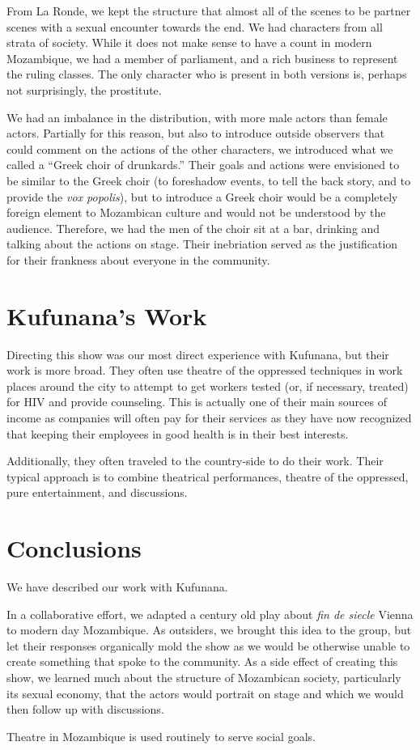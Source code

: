 \documentclass[article,twocolumn,twoside]{memoir}
\begin{document}
From La Ronde, we kept the structure that almost all of the scenes to be
partner scenes with a sexual encounter towards the end. We had characters from
all strata of society.  While it does not make sense to have a count in modern
Mozambique, we had a member of parliament, and a rich business to represent the
ruling classes. The only character who is present in both versions is, perhaps
not surprisingly, the prostitute.

We had an imbalance in the distribution, with more male actors than female
actors. Partially for this reason, but also to introduce outside observers that
could comment on the actions of the other characters, we introduced what we
called a ``Greek choir of drunkards.'' Their goals and actions were envisioned
to be similar to the Greek choir (to foreshadow events, to tell the back story,
and to provide the \textit{vox popolis}), but to introduce a Greek choir would
be a completely foreign element to Mozambican culture and would not be
understood by the audience. Therefore, we had the men of the choir sit at a
bar, drinking and talking about the actions on stage. Their inebriation served
as the justification for their frankness about everyone in the community.

\chapter{Kufunana's Work}

Directing this show was our most direct experience with Kufunana, but their
work is more broad. They often use theatre of the oppressed techniques in work
places around the city to attempt to get workers tested (or, if necessary,
treated) for HIV and provide counseling. This is actually one of their main
sources of income as companies will often pay for their services as they have
now recognized that keeping their employees in good health is in their best
interests.

Additionally, they often traveled to the country-side to do their work. Their
typical approach is to combine theatrical performances, theatre of the
oppressed, pure entertainment, and discussions.

\chapter{Conclusions}
We have described our work with Kufunana.

In a collaborative effort, we adapted a century old play about \textit{fin de
siecle} Vienna to modern day Mozambique. As outsiders, we brought this idea to
the group, but let their responses organically mold the show as we would be
otherwise unable to create something that spoke to the community. As a side
effect of creating this show, we learned much about the structure of Mozambican
society, particularly its sexual economy, that the actors would portrait on
stage and which we would then follow up with discussions.

Theatre in Mozambique is used routinely to serve social goals.
\end{document}
